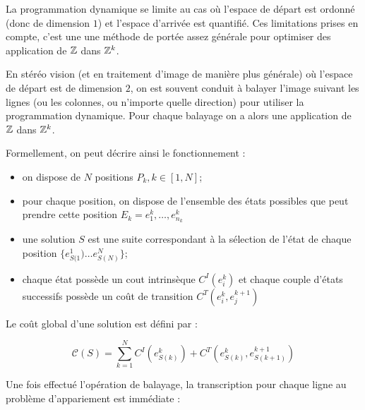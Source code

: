 La programmation dynamique se limite au cas o\`u l'espace de d\'epart est
ordonn\'e (donc de dimension $1$) et l'espace d'arriv\'ee est quantifi\'e.
Ces limitations prises en compte, c'est une 
une m\'ethode de port\'ee assez g\'en\'erale
pour optimiser   des application de  $\ZZ$ dans $\ZZ^k$.

En st\'er\'eo vision (et en traitement d'image de mani\`ere plus
g\'en\'erale)  o\`u l'espace de d\'epart est de dimension $2$,
on est souvent conduit \`a balayer l'image suivant les
lignes (ou les colonnes, ou n'importe quelle direction)
pour utiliser la programmation dynamique.
Pour chaque balayage on a alors une application de $\ZZ$ dans $\ZZ^k$.


Formellement, on peut d\'ecrire ainsi le fonctionnement :

\begin{itemize}
   \item on dispose de $N$ positions $P_k ,  k \in [1,N]$;

   \item pour chaque position, on dispose de  l'ensemble des
         \'etats possibles que peut prendre cette position 
	 $E_k ={e^k_1,\dots,e^k_{n_k}} $

   \item une solution $S$ est une suite correspondant \`a la
          s\'election de l'\'etat de chaque position $\{e^1_{S(1}) \dots e^N_{S(N)}\}$;

    \item  chaque \'etat poss\`ede un cout intrins\`eque $C^I(e^k_i)$ et chaque
           couple d'\'etats successifs poss\`ede un co\^ut de transition $C^T(e^k_i,e^{k+1}_j)$
\end{itemize}

Le co\^ut global d'une solution est d\'efini par :

\begin{equation}
  \mathcal C (S) = \sum_{k=1}^N  C^I(e^k_{S(k)}) + C^T(e^k_{S(k)},e^{k+1}_{S(k+1)})
\end{equation}

Une fois effectu\'e l'op\'eration de balayage, la transcription pour chaque
ligne au probl\`eme d'appariement  est imm\'ediate :

